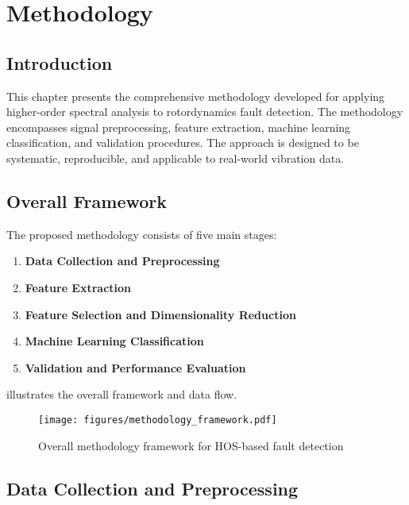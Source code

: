 
\chapter{Methodology}

\section{Introduction}

This chapter presents the comprehensive methodology developed for applying higher-order spectral analysis to rotordynamics fault detection. The methodology encompasses signal preprocessing, feature extraction, machine learning classification, and validation procedures. The approach is designed to be systematic, reproducible, and applicable to real-world vibration data.

\section{Overall Framework}

The proposed methodology consists of five main stages:

\begin{enumerate}
    \item \textbf{Data Collection and Preprocessing}
    \item \textbf{Feature Extraction}
    \item \textbf{Feature Selection and Dimensionality Reduction}
    \item \textbf{Machine Learning Classification}
    \item \textbf{Validation and Performance Evaluation}
\end{enumerate}

 illustrates the overall framework and data flow.

\begin{figure}[H]
\centering
\texttt{[image: figures/methodology\_framework.pdf]}
\caption{Overall methodology framework for HOS-based fault detection}
\label{fig:methodology_framework}
\end{figure}

\section{Data Collection and Preprocessing}

